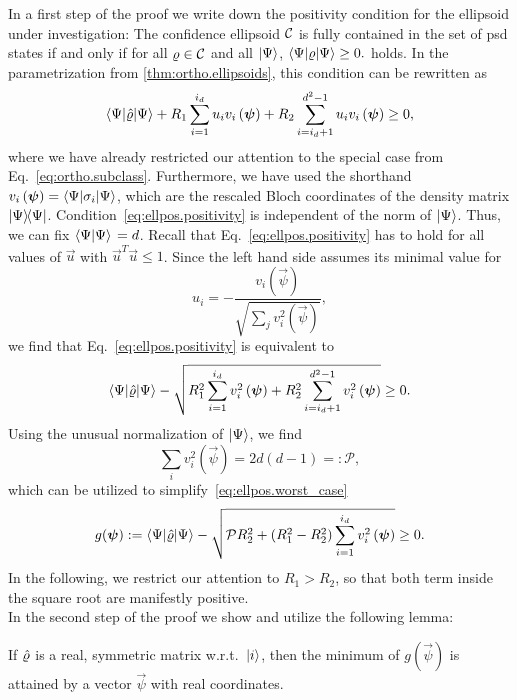 In a first step of the proof we write down the positivity condition for the ellipsoid under investigation:
The confidence ellipsoid $\mathcal{C}$ is fully contained in the set of psd states if and only if for all $\varrho \in \mathcal{C}$ and all $\ket{\Psi}$,
\(
  \bra{\Psi} \varrho \ket{\Psi} \ge 0.
\)
holds.
In the parametrization from \cref{thm:ortho.ellipsoids}, this condition can be rewritten as
\[
  \bra{\Psi}\estim{\varrho} \ket{\Psi} +R_{1}\sum_{i=1}^{i_{d}}u_{i}v_{i}\left(\vec\psi\right)+R_{2}\sum_{i=i_{d}+1}^{d^{2}-1}u_{i}v_{i}\left(\vec\psi\right)\geq0,
  \label{eq:ellpos.positivity}
\]
where we have already restricted our attention to the special case from Eq.~\eqref{eq:ortho.subclass}.
Furthermore, we have used the shorthand $v_{i}\left(\vec\psi\right)=\bra{\Psi}\sigma_{i} \ket{\Psi} $, which are the rescaled Bloch coordinates of the density matrix $\ket{\Psi} \bra{\Psi}$.
Condition~\eqref{eq:ellpos.positivity} is independent of the norm of $\ket{\Psi}$.
Thus, we can fix $\left\langle \Psi \ket{\Psi} \right. = d$.
Recall that Eq.~\eqref{eq:ellpos.positivity} has to hold for all values of $\vec u$ with $\vec u^T \vec u \le 1$.
Since the left hand side assumes its minimal value for
\[
  u_{i} = -\frac{v_{i}\left(\vec\psi\right)}{\sqrt{\sum_{j}v_{i}^{2}\left(\vec\psi\right)}},
\]
we find that Eq.~\eqref{eq:ellpos.positivity} is equivalent to
\[
 \bra{\Psi}\estim{\varrho} \ket{\Psi} -\sqrt{R_{1}^{2}\sum_{i=1}^{i_{d}}v_{i}^{2}\left(\vec\psi\right)+R_{2}^{2}\sum_{i=i_{d}+1}^{d^{2}-1}v_{i}^{2}\left(\vec\psi\right)}\geq0.
  \label{eq:ellpos.worst_case}
\]
Using the unusual normalization of $\ket\Psi$, we find
\[
  \sum_{i}v_{i}^{2}\left(\vec\psi\right)=2 d\left(d-1\right) =: \mathcal{P},
\]
which can be utilized to simplify~\eqref{eq:ellpos.worst_case}
\[
 g(\vec\psi) := \bra{\Psi}\estim{\varrho} \ket{\Psi} -\sqrt{\mathcal{P}R_{2}^{2}+\left(R_{1}^{2}-R_{2}^{2}\right)\sum_{i=1}^{i_{d}}v_{i}^{2}\left(\vec\psi\right)}\geq0.
  \label{eq:ellpos.major}
\]
In the following, we restrict our attention to  $R_{1}>R_{2}$, so that both term inside the square root are manifestly positive.\\
In the second step of the proof we show and utilize the following lemma:
\begin{lemma}\label{lem:ellpos.real_min}
  If $\hat{\varrho}$ is a real, symmetric matrix w.r.t.\ $\ket{i}$, then the minimum of $g(\vec\psi)$ is attained by a vector $\vec{\psi}$ with real coordinates.
\end{lemma}
